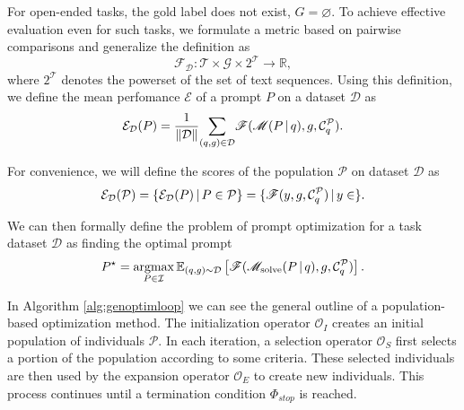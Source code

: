 For open-ended tasks, the gold label does not exist, $G = \varnothing$. To achieve effective evaluation even for such tasks, 
we formulate a metric based on pairwise comparisons and generalize the definition as
\begin{equation}
    \mathscr{F}_{\mathcal{D}}: \mathcal{T} \times \mathcal{G} \times 2^\mathcal{T} \rightarrow \mathbb{R},
\end{equation}
where $2^\mathcal{T}$ denotes the powerset of the set of text sequences. Using this definition, we define the mean perfomance $\mathcal{E}$ of a prompt $P$ on a dataset $\mathcal{D}$ as
\begin{equation}
    \mathcal{E}_{\mathcal{D}}(P) = \frac{1}{\Vert \mathcal{D} \Vert}\underset{(q,g)\in \mathcal{D}}{\sum}\mathscr{F}(\mathscr{M}(P\, \vert \, q), g, \mathcal{C}_{q}^{\mathcal{P}}).
\end{equation}


For convenience, we will define the scores of the population $\mathcal{P}$ on dataset $\mathcal{D}$ as
\begin{equation}
    \mathcal{E}_{\mathcal{D}}(\mathcal{P}) = \{\mathcal{E}_{\mathcal{D}}(P)\, \vert \, P\in \mathcal{P}\} = \{\mathscr{F}(y, g, \mathcal{C}_{q}^{\mathcal{P}})\, \vert \, y \in \}.
\end{equation}

We can then formally define the problem of prompt optimization for a task dataset $\mathcal{D}$ as finding the optimal prompt 
\begin{equation}
    \label{eq:optimdef}
    P^{\star} = \underset{P\in\mathcal{I}}{\operatorname{argmax}}\,\mathbb{E}_{(q, g) \sim \mathcal{D}}\left[\mathscr{F}(\mathscr{M}_{\text{solve}}(P \, \vert \, q), g, \mathcal{C}_{q}^{\mathcal{P}})\right].
\end{equation}

In Algorithm \ref{alg:genoptimloop} we can see the general outline of a population-based optimization method.
The initialization operator $\mathscr{O}_I$ creates an initial population of individuals $\mathcal{P}$. 
In each iteration, a selection operator $\mathscr{O}_S$ first selects a portion of the population according to some criteria. 
These selected individuals are then used by the expansion operator $\mathscr{O}_E$ to create new individuals.
This process continues until a termination condition $\Phi_{stop}$ is reached.

